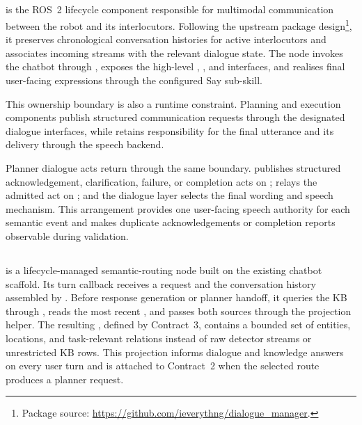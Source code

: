 \subsection{}

 is the ROS~2 lifecycle component responsible for multimodal communication between the robot and its interlocutors. Following the upstream package design\footnote{Package source: \url{https://github.com/ieverythng/dialogue_manager}.}, it preserves chronological conversation histories for active interlocutors and associates incoming  streams with the relevant dialogue state. The node invokes the chatbot through , exposes the high-level , , and  interfaces, and realises final user-facing expressions through the configured Say sub-skill.

This ownership boundary is also a runtime constraint. Planning and execution components publish structured communication requests through the designated dialogue interfaces, while  retains responsibility for the final utterance and its delivery through the speech backend.

Planner dialogue acts return through the same boundary.  publishes structured acknowledgement, clarification, failure, or completion acts on ;  relays the admitted act on ; and the dialogue layer selects the final wording and speech mechanism. This arrangement provides one user-facing speech authority for each semantic event and makes duplicate acknowledgements or completion reports observable during validation.

\subsection{}

 is a lifecycle-managed semantic-routing node built on the existing chatbot scaffold. Its turn callback receives a  request and the conversation history assembled by . Before response generation or planner handoff, it queries the KB through , reads the most recent , and passes both sources through the  projection helper. The resulting , defined by Contract~3, contains a bounded set of entities, locations, and task-relevant relations instead of raw detector streams or unrestricted KB rows. This projection informs dialogue and knowledge answers on every user turn and is attached to Contract~2 when the selected route produces a planner request.

